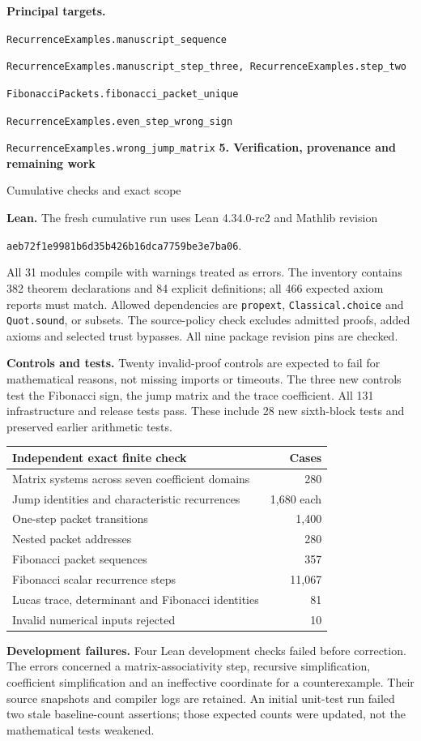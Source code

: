 \documentclass[11pt]{article}
\newcommand{\target}[1]{{\footnotesize\texttt{#1}}}
\newcommand{\pageheading}[2]{{\Large\bfseries\color{ink}#1}\par{\small #2}\par\medskip}
\begin{document}
\textbf{Principal targets.}\par
\target{RecurrenceExamples.manuscript\_sequence}\par
\target{RecurrenceExamples.manuscript\_step\_three, RecurrenceExamples.step\_two}\par
\target{FibonacciPackets.fibonacci\_packet\_unique}\par
\target{RecurrenceExamples.even\_step\_wrong\_sign}\par
\target{RecurrenceExamples.wrong\_jump\_matrix}
\newpage
\pageheading{5. Verification, provenance and remaining work}{Cumulative checks and exact scope}
\textbf{Lean.} The fresh cumulative run uses Lean 4.34.0-rc2 and Mathlib revision
\begin{center}\small\texttt{aeb72f1e9981b6d35b426b16dca7759be3e7ba06}.\end{center}
All 31 modules compile with warnings treated as errors. The inventory contains 382 theorem declarations and 84 explicit definitions; all 466 expected axiom reports must match. Allowed dependencies are \texttt{propext}, \texttt{Classical.choice} and \texttt{Quot.sound}, or subsets. The source-policy check excludes admitted proofs, added axioms and selected trust bypasses. All nine package revision pins are checked.

\textbf{Controls and tests.} Twenty invalid-proof controls are expected to fail for mathematical reasons, not missing imports or timeouts. The three new controls test the Fibonacci sign, the jump matrix and the trace coefficient. All 131 infrastructure and release tests pass. These include 28 new sixth-block tests and preserved earlier arithmetic tests.

\begin{center}
\begin{tabular}{@{}lr@{}}
\toprule
Independent exact finite check & Cases\\\midrule
Matrix systems across seven coefficient domains & 280\\
Jump identities and characteristic recurrences & 1,680 each\\
One-step packet transitions & 1,400\\
Nested packet addresses & 280\\
Fibonacci packet sequences & 357\\
Fibonacci scalar recurrence steps & 11,067\\
Lucas trace, determinant and Fibonacci identities & 81\\
Invalid numerical inputs rejected & 10\\\bottomrule
\end{tabular}
\end{center}
\textbf{Development failures.} Four Lean development checks failed before correction. The errors concerned a matrix-associativity step, recursive simplification, coefficient simplification and an ineffective coordinate for a counterexample. Their source snapshots and compiler logs are retained. An initial unit-test run failed two stale baseline-count assertions; those expected counts were updated, not the mathematical tests weakened.
\end{document}
